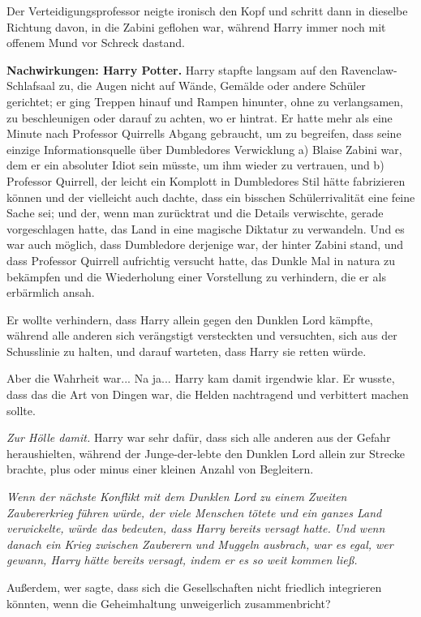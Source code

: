 Der Verteidigungsprofessor neigte ironisch den Kopf und schritt dann in dieselbe
Richtung davon, in die Zabini geflohen war, während Harry immer noch mit offenem
Mund vor Schreck dastand.


\textbf{Nachwirkungen: Harry Potter. }
Harry stapfte langsam auf den Ravenclaw-Schlafsaal zu, die Augen nicht auf
Wände, Gemälde oder andere Schüler gerichtet; er ging Treppen hinauf und Rampen
hinunter, ohne zu verlangsamen, zu beschleunigen oder darauf zu achten, wo er
hintrat. Er hatte mehr als eine Minute nach Professor Quirrells Abgang
gebraucht, um zu begreifen, dass seine einzige Informationsquelle über
Dumbledores Verwicklung a) Blaise Zabini war, dem er ein absoluter Idiot sein
müsste, um ihm wieder zu vertrauen, und b) Professor Quirrell, der leicht ein
Komplott in Dumbledores Stil hätte fabrizieren können und der vielleicht auch
dachte, dass ein bisschen Schülerrivalität eine feine Sache sei; und der, wenn
man zurücktrat und die Details verwischte, gerade vorgeschlagen hatte, das Land
in eine magische Diktatur zu verwandeln. Und es war auch möglich, dass
Dumbledore derjenige war, der hinter Zabini stand, und dass Professor Quirrell
aufrichtig versucht hatte, das Dunkle Mal in natura zu bekämpfen und die
Wiederholung einer Vorstellung zu verhindern, die er als erbärmlich ansah.

Er wollte verhindern, dass Harry allein gegen den Dunklen Lord kämpfte, während
alle anderen sich verängstigt versteckten und versuchten, sich aus der
Schusslinie zu halten, und darauf warteten, dass Harry sie retten würde.

Aber die Wahrheit war... Na ja... Harry kam damit irgendwie klar. Er wusste,
dass das die Art von Dingen war, die Helden nachtragend und verbittert machen
sollte.

\emph{ Zur Hölle damit. }Harry war sehr dafür, dass sich alle anderen aus der
Gefahr heraushielten, während der Junge-der-lebte den Dunklen Lord allein zur
Strecke brachte, plus oder minus einer kleinen Anzahl von Begleitern.

\emph{ Wenn der nächste Konflikt mit dem Dunklen Lord zu einem Zweiten Zaubererkrieg führen würde, der viele Menschen tötete und ein ganzes Land verwickelte, würde das bedeuten, dass Harry bereits versagt hatte.}
\emph{ Und wenn danach ein Krieg zwischen Zauberern und Muggeln ausbrach, war es
egal, wer gewann, Harry hätte bereits versagt, indem er es so weit kommen ließ.}

Außerdem, wer sagte, dass sich die Gesellschaften nicht friedlich integrieren
könnten, wenn die Geheimhaltung unweigerlich zusammenbricht?

